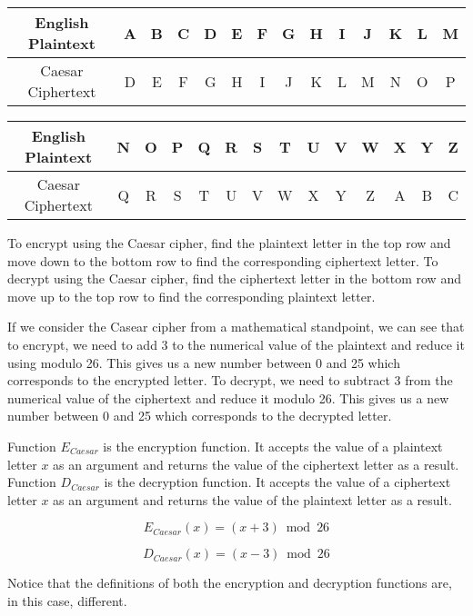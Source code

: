 \Large
\begin{center}
  \begin{tabular}{|c|c|c|c|c|c|c|c|c|c|c|c|c|c|}
  \hline
    English Plaintext & A & B & C & D & E & F & G & H & I & J & K & L & M \\ \hline
	Caesar Ciphertext & D & E & F & G & H & I & J & K & L & M & N & O & P \\ \hline
  \end{tabular}
\end{center}

\begin{center}
  \begin{tabular}{|c|c|c|c|c|c|c|c|c|c|c|c|c|c|}
  \hline
    English Plaintext & N & O & P & Q & R & S & T & U & V & W & X & Y & Z \\ \hline
    Caesar Ciphertext & Q & R & S & T & U & V & W & X & Y & Z & A & B & C \\ \hline
  \end{tabular}
\end{center}

\normalsize

To encrypt using the Caesar cipher, find the plaintext letter in the top row and move down to the bottom row to find the corresponding ciphertext letter. To decrypt using the Caesar cipher, find the ciphertext letter in the bottom row and move up to the top row to find the corresponding plaintext letter.

If we consider the Casear cipher from a mathematical standpoint, we can see that to encrypt, we need to add 3 to the numerical value of the plaintext and reduce it using modulo 26. This gives us a new number between 0 and 25 which corresponds to the encrypted letter. To decrypt, we need to subtract 3 from the numerical value of the ciphertext and reduce it modulo 26. This gives us a new number between 0 and 25 which corresponds to the decrypted letter.

Function $E_{Caesar}$ is the encryption function. It accepts the value of a plaintext letter $x$ as an argument and returns the value of the ciphertext letter as a result. Function $D_{Caesar}$ is the decryption function. It accepts the value of a ciphertext letter $x$ as an argument and returns the value of the plaintext letter as a result.

\[
  E_{Caesar}(x) = (x + 3) \bmod 26
\]

\[
  D_{Caesar}(x) = (x - 3) \bmod 26
\]

Notice that the definitions of both the encryption and decryption functions are, in this case, different.


